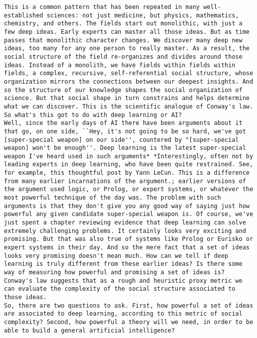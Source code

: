 \begin{lstlisting}
This is a common pattern that has been repeated in many well-established sciences: not just medicine, but physics, mathematics, chemistry, and others. The fields start out monolithic, with just a few deep ideas. Early experts can master all those ideas. But as time passes that monolithic character changes. We discover many deep new ideas, too many for any one person to really master. As a result, the social structure of the field re-organizes and divides around those ideas. Instead of a monolith, we have fields within fields within fields, a complex, recursive, self-referential social structure, whose organization mirrors the connections between our deepest insights. And so the structure of our knowledge shapes the social organization of science. But that social shape in turn constrains and helps determine what we can discover. This is the scientific analogue of Conway's law. 
So what's this got to do with deep learning or AI?
Well, since the early days of AI there have been arguments about it that go, on one side, ``Hey, it's not going to be so hard, we've got [super-special weapon] on our side'', countered by "[super-special weapon] won't be enough''. Deep learning is the latest super-special weapon I've heard used in such arguments* *Interestingly, often not by leading experts in deep learning, who have been quite restrained. See, for example, this thoughtful post by Yann LeCun. This is a difference from many earlier incarnations of the argument.; earlier versions of the argument used logic, or Prolog, or expert systems, or whatever the most powerful technique of the day was. The problem with such arguments is that they don't give you any good way of saying just how powerful any given candidate super-special weapon is. Of course, we've just spent a chapter reviewing evidence that deep learning can solve extremely challenging problems. It certainly looks very exciting and promising. But that was also true of systems like Prolog or Eurisko or expert systems in their day. And so the mere fact that a set of ideas looks very promising doesn't mean much. How can we tell if deep learning is truly different from these earlier ideas? Is there some way of measuring how powerful and promising a set of ideas is? Conway's law suggests that as a rough and heuristic proxy metric we can evaluate the complexity of the social structure associated to those ideas.
So, there are two questions to ask. First, how powerful a set of ideas are associated to deep learning, according to this metric of social complexity? Second, how powerful a theory will we need, in order to be able to build a general artificial intelligence?

\end{lstlisting}
